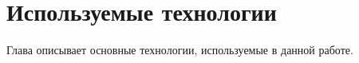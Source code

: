 \section{Используемые технологии}

Глава описывает основные технологии, используемые в данной работе. 





